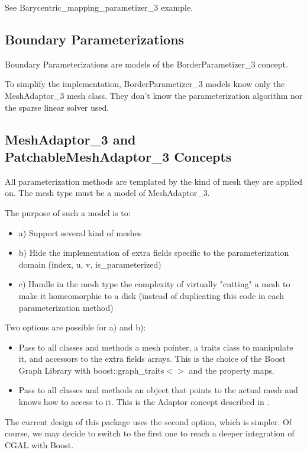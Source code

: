 See Barycentric\_mapping\_parametizer\_3 example.


\subsection{Boundary Parameterizations}

Boundary Parameterizations are models of the BorderParametizer\_3 concept.

To simplify the implementation, BorderParametizer\_3 models know only the
MeshAdaptor\_3 mesh class. They don't know the parameterization algorithm
nor the sparse linear solver used.


\subsection{MeshAdaptor\_3 and PatchableMeshAdaptor\_3 Concepts}

All parameterization methods are templated by the kind of mesh they are applied on.
The mesh type must be a model of MeshAdaptor\_3.

The purpose of such a model is to:
\begin{itemize}
\item a) Support several kind of meshes
\item b) Hide the implementation of extra fields specific to the parameterization domain
      (index, u, v, is\_parameterized)
\item c) Handle in the mesh type the complexity of virtually "cutting" a mesh
      to make it homeomorphic to a disk (instead of duplicating this
      code in each parameterization method)
\end{itemize}

Two options are possible for a) and b):
\begin{itemize}
\item Pass to all classes and methods a mesh pointer, a traits class to manipulate it,
      and accessors to the extra fields arrays.
      This is the choice of the Boost Graph Library with boost::graph\_traits$<>$
      and the property maps.
\item Pass to all classes and methods an object that points to the actual mesh and knows
      how to access to it. This is the Adaptor concept described in
      \cite{cgal:ghjv-dpero-95}.
\end{itemize}

The current design of this package uses the second option, which is simpler.
Of course, we may decide to switch to the first one to reach a deeper integration
of CGAL with Boost.

